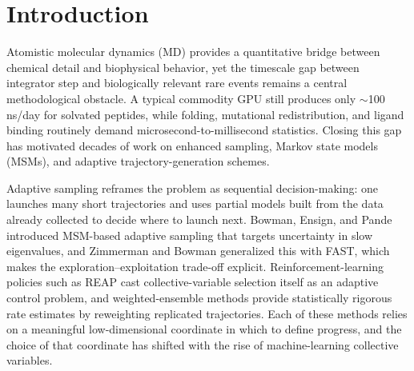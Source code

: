 \documentclass[journal=jctcce,manuscript=article,layout=twocolumn]{achemso}
\begin{document}
\begin{tocentry}
\centering
{}
\end{tocentry}

\section{Introduction}

Atomistic molecular dynamics (MD) provides a quantitative bridge between chemical detail and biophysical behavior, yet the timescale gap between integrator step and biologically relevant rare events remains a central methodological obstacle.\cite{lindorff2011how,chodera2014markov} A typical commodity GPU still produces only $\sim$100\,ns/day for solvated peptides, while folding, mutational redistribution, and ligand binding routinely demand microsecond-to-millisecond statistics. Closing this gap has motivated decades of work on enhanced sampling, Markov state models (MSMs), and adaptive trajectory-generation schemes.\cite{laio2002escaping,barducci2008well,prinz2011markov,husic2018markov,zuckerman2017weighted,huber1996we}

Adaptive sampling reframes the problem as sequential decision-making: one launches many short trajectories and uses partial models built from the data already collected to decide where to launch next. Bowman, Ensign, and Pande introduced MSM-based adaptive sampling that targets uncertainty in slow eigenvalues,\cite{bowman2010adaptive} and Zimmerman and Bowman generalized this with FAST, which makes the exploration--exploitation trade-off explicit.\cite{zimmerman2015fast} Reinforcement-learning policies such as REAP cast collective-variable selection itself as an adaptive control problem,\cite{shamsi2018reap,kleiman2022multiagent} and weighted-ensemble methods provide statistically rigorous rate estimates by reweighting replicated trajectories.\cite{huber1996we,zuckerman2017weighted,yang2024werl} Each of these methods relies on a meaningful low-dimensional coordinate in which to define progress, and the choice of that coordinate has shifted with the rise of machine-learning collective variables.
\end{document}
